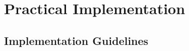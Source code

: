 \documentclass[11pt,oneside]{book}
\theoremstyle{definition}
\theoremstyle{plain}
\theoremstyle{remark}
\begin{document}
\part{Practical Implementation}

\chapter{Implementation Guidelines}







% 
% 
% 
% 
% 

% 
% 
% 
% 
% 



% 
% 
% 
% 
% 

% 
% 
% 
% 
% 

\printbibliography[heading=bibintoc,title={References}]

\printindex
\end{document}
